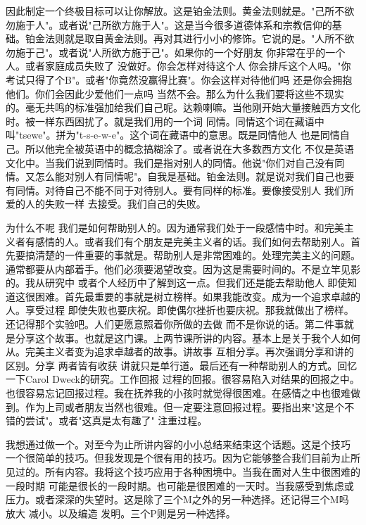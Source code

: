 因此制定一个终极目标可以让你解放。这是铂金法则。黄金法则就是。"己所不欲勿施于人"。或者说"己所欲方施于人"。这是当今很多道德体系和宗教信仰的基础。铂金法则就是取自黄金法则。再对其进行小小的修饰。它说的是。"人所不欲勿施于己"。或者说"人所欲方施于己"。如果你的一个好朋友 你非常在乎的一个人。或者家庭成员失败了 没做好。你会怎样对待这个人 你会排斥这个人吗。"你考试只得了个B"。或者"你竟然没赢得比赛"。你会这样对待他们吗 还是你会拥抱他们。你们会因此少爱他们一点吗 当然不会。那么为什么我们要将这些不现实的。毫无共鸣的标准强加给我们自己呢。达赖喇嘛。当他刚开始大量接触西方文化时。被一样东西困扰了。就是我们用的一个词 同情。同情这个词在藏语中叫"tsewe"。拼为"t-s-e-w-e"。这个词在藏语中的意思。既是同情他人 也是同情自己。所以他完全被英语中的概念搞糊涂了。或者说在大多数西方文化 不仅是英语文化中。当我们说到同情时。我们是指对别人的同情。他说"你们对自己没有同情。又怎么能对别人有同情呢"。自我是基础。铂金法则。就是说对我们自己也要有同情。对待自己不能不同于对待别人。要有同样的标准。要像接受别人 我们所爱的人的失败一样 去接受。我们自己的失败。 

为什么不呢 我们是如何帮助别人的。因为通常我们处于一段感情中时。和完美主义者有感情的人。或者我们有个朋友是完美主义者的话。我们如何去帮助别人。首先要搞清楚的一件重要的事就是。帮助别人是非常困难的。处理完美主义的问题。通常都要从内部着手。他们必须要渴望改变。因为这是需要时间的。不是立竿见影的。我从研究中 或者个人经历中了解到这一点。但我们还是能去帮助他人 即使知道这很困难。首先最重要的事就是树立榜样。如果我能改变。成为一个追求卓越的人。享受过程 即使失败也要庆祝。即使偶尔挫折也要庆祝。那我就做出了榜样。还记得那个实验吧。人们更愿意照着你所做的去做 而不是你说的话。第二件事就是分享这个故事。也就是这门课。上两节课所讲的内容。基本上是关于我个人如何从。完美主义者变为追求卓越者的故事。讲故事 互相分享。再次强调分享和讲的区别。分享 两者皆有收获 讲就只是单行道。最后还有一种帮助别人的方式。回忆一下Carol Dweck的研究。工作回报 过程的回报。很容易陷入对结果的回报之中。也很容易忘记回报过程。我在抚养我的小孩时就觉得很困难。在感情之中也很难做到。作为上司或者朋友当然也很难。但一定要注意回报过程。要指出来"这是个不错的尝试"。或者"这真是太有趣了" 注重过程。 

我想通过做一个。对至今为止所讲内容的小小总结来结束这个话题。这是个技巧 一个很简单的技巧。但我发现是个很有用的技巧。因为它能够整合我们目前为止所见过的。所有内容。我将这个技巧应用于各种困境中。当我在面对人生中很困难的一段时期 可能是很长的一段时期。也可能是很困难的一天时。当我感受到焦虑或压力。或者深深的失望时。这是除了三个M之外的另一种选择。还记得三个M吗 放大 减小。以及编造 发明。三个P则是另一种选择。 

